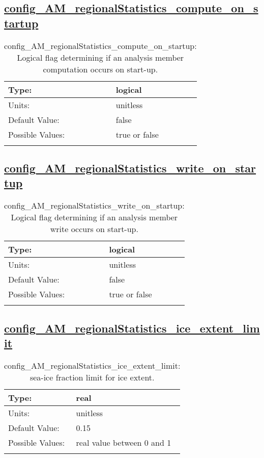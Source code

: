 \subsection[config\_AM\_regionalStatistics\_compute\_on\_startup]{\hyperref[sec:nm_tab_AM_regionalStatistics]{config\_AM\_regionalStatistics\_compute\_on\_startup}}
\label{subsec:nm_sec_config_AM_regionalStatistics_compute_on_startup}
\begin{center}
\begin{longtable}{| p{2.0in} || p{4.0in} |}
    \hline
    Type: & logical \\
    \hline
    Units: & \si{unitless} \\
    \hline
    Default Value: & false \\
    \hline
    Possible Values: & true or false \\
    \hline
    \caption{config\_AM\_regionalStatistics\_compute\_on\_startup: Logical flag determining if an analysis member computation occurs on start-up.}
\end{longtable}
\end{center}
\subsection[config\_AM\_regionalStatistics\_write\_on\_startup]{\hyperref[sec:nm_tab_AM_regionalStatistics]{config\_AM\_regionalStatistics\_write\_on\_startup}}
\label{subsec:nm_sec_config_AM_regionalStatistics_write_on_startup}
\begin{center}
\begin{longtable}{| p{2.0in} || p{4.0in} |}
    \hline
    Type: & logical \\
    \hline
    Units: & \si{unitless} \\
    \hline
    Default Value: & false \\
    \hline
    Possible Values: & true or false \\
    \hline
    \caption{config\_AM\_regionalStatistics\_write\_on\_startup: Logical flag determining if an analysis member write occurs on start-up.}
\end{longtable}
\end{center}
\subsection[config\_AM\_regionalStatistics\_ice\_extent\_limit]{\hyperref[sec:nm_tab_AM_regionalStatistics]{config\_AM\_regionalStatistics\_ice\_extent\_limit}}
\label{subsec:nm_sec_config_AM_regionalStatistics_ice_extent_limit}
\begin{center}
\begin{longtable}{| p{2.0in} || p{4.0in} |}
    \hline
    Type: & real \\
    \hline
    Units: & \si{unitless} \\
    \hline
    Default Value: & 0.15 \\
    \hline
    Possible Values: & real value between 0 and 1 \\
    \hline
    \caption{config\_AM\_regionalStatistics\_ice\_extent\_limit: sea-ice fraction limit for ice extent.}
\end{longtable}
\end{center}

